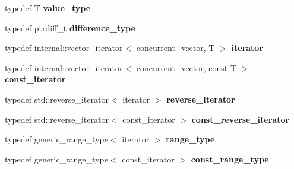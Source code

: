 \begin{DoxyCompactItemize}
\item 
\hypertarget{classtbb_1_1concurrent__vector_ab003d639b66a437b93a432dfa8d5019d}{}typedef T {\bfseries value\+\_\+type}\label{classtbb_1_1concurrent__vector_ab003d639b66a437b93a432dfa8d5019d}

\item 
\hypertarget{classtbb_1_1concurrent__vector_a6a98de52958f58ff7519a8ced40ce0b8}{}typedef ptrdiff\+\_\+t {\bfseries difference\+\_\+type}\label{classtbb_1_1concurrent__vector_a6a98de52958f58ff7519a8ced40ce0b8}

\item 
\hypertarget{classtbb_1_1concurrent__vector_a1d8a0e7add13ae70d1f0193cd2c64b91}{}typedef internal\+::vector\+\_\+iterator$<$ \hyperlink{classtbb_1_1concurrent__vector}{concurrent\+\_\+vector}, T $>$ {\bfseries iterator}\label{classtbb_1_1concurrent__vector_a1d8a0e7add13ae70d1f0193cd2c64b91}

\item 
\hypertarget{classtbb_1_1concurrent__vector_ad0c6fa6c0bc90835d96de2aad2351ed6}{}typedef internal\+::vector\+\_\+iterator$<$ \hyperlink{classtbb_1_1concurrent__vector}{concurrent\+\_\+vector}, const T $>$ {\bfseries const\+\_\+iterator}\label{classtbb_1_1concurrent__vector_ad0c6fa6c0bc90835d96de2aad2351ed6}

\item 
\hypertarget{classtbb_1_1concurrent__vector_a3312c530fa816ebee6693b27ab4bc983}{}typedef std\+::reverse\+\_\+iterator$<$ iterator $>$ {\bfseries reverse\+\_\+iterator}\label{classtbb_1_1concurrent__vector_a3312c530fa816ebee6693b27ab4bc983}

\item 
\hypertarget{classtbb_1_1concurrent__vector_aff6be5a78f8959dc548fdc7b1876cbff}{}typedef std\+::reverse\+\_\+iterator$<$ const\+\_\+iterator $>$ {\bfseries const\+\_\+reverse\+\_\+iterator}\label{classtbb_1_1concurrent__vector_aff6be5a78f8959dc548fdc7b1876cbff}

\item 
\hypertarget{classtbb_1_1concurrent__vector_a7aedde01d4998b65c4fdb36ea4c9b9ce}{}typedef generic\+\_\+range\+\_\+type$<$ iterator $>$ {\bfseries range\+\_\+type}\label{classtbb_1_1concurrent__vector_a7aedde01d4998b65c4fdb36ea4c9b9ce}

\item 
\hypertarget{classtbb_1_1concurrent__vector_af2f8e0834cbaf80e43bad6be140a03c1}{}typedef generic\+\_\+range\+\_\+type$<$ const\+\_\+iterator $>$ {\bfseries const\+\_\+range\+\_\+type}\label{classtbb_1_1concurrent__vector_af2f8e0834cbaf80e43bad6be140a03c1}

\end{DoxyCompactItemize}
